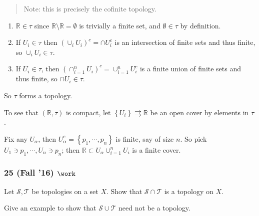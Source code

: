 \begin{solution}

\hfill

\begin{concept}

\hfill

\end{concept}

\begin{quote}
Note: this is precisely the cofinite topology.
\end{quote}

\begin{enumerate}
\def\labelenumi{\arabic{enumi}.}
\tightlist
\item
  \({\mathbb{R}}\in \tau\) since
  \({\mathbb{R}}\setminus {\mathbb{R}}= \emptyset\) is trivially a
  finite set, and \(\emptyset \in \tau\) by definition.
\item
  If \(U_i \in \tau\) then \((\cup_i U_i)^c = \cap U_i^c\) is an
  intersection of finite sets and thus finite, so
  \(\cup_i U_i \in \tau\).
\item
  If \(U_i \in \tau\), then
  \((\cap_{i=1}^n U_i)^c = \cup_{i=1}^n U_i^c\) is a finite union of
  finite sets and thus finite, so \(\cap U_i \in \tau\).
\end{enumerate}

So \(\tau\) forms a topology.

To see that \(({\mathbb{R}}, \tau)\) is compact, let
\(\left\{{U_i}\right\} \rightrightarrows {\mathbb{R}}\) be an open cover
by elements in \(\tau\).

Fix any \(U_\alpha\), then
\(U_\alpha^c = \left\{{p_1, \cdots, p_n}\right\}\) is finite, say of
size \(n\). So pick \(U_1 \ni p_1, \cdots, U_n \ni p_n\); then
\({\mathbb{R}}\subset U_\alpha \cup_{i=1}^n U_i\) is a finite cover.

\end{solution}

\hypertarget{fall-16-work}{%
\subsubsection{\texorpdfstring{25 (Fall '16)
\(\work\)}{25 (Fall '16) \textbackslash work}}\label{fall-16-work}}

Let \({\mathcal{S}}, {\mathcal{T}}\) be topologies on a set \(X\). Show
that \({\mathcal{S}}\cap {\mathcal{T}}\) is a topology on \(X\).

Give an example to show that \({\mathcal{S}}\cup {\mathcal{T}}\) need
not be a topology.

